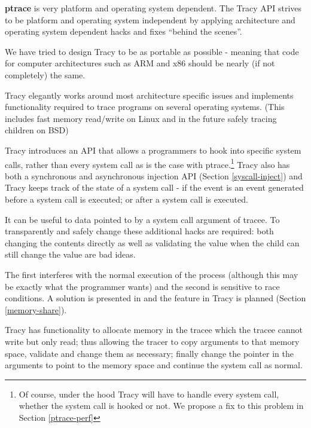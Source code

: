 \documentclass[a4paper, 10pt]{report}
\begin{document}
\textbf{ptrace} is very platform and operating system dependent.
The Tracy API strives to be platform and operating system independent by
applying architecture and operating system dependent hacks and fixes
``behind the scenes''.

We have tried to design Tracy to be as portable as possible - meaning that code
for computer architectures such as ARM and x86 should be nearly
(if not completely) the same.


Tracy elegantly works around most architecture specific issues and implements
functionality required to trace programs on several operating systems.
(This includes fast memory read/write on Linux and in the future safely tracing
children on BSD)

Tracy introduces an API that allows a programmers to hook into specific system
calls, rather than every system call as is the case with ptrace.\footnote{Of
course, under the hood Tracy will have to handle every system call, whether
the system call is hooked or not. We propose a fix to this problem in
Section \ref{ptrace-perf}} Tracy also has both a synchronous and asynchronous
injection API (Section \ref{syscall-inject}) and Tracy keeps
track of the state of a system call - if the event is an event generated before
a system call is executed; or after a system call is executed.

It can be useful to data pointed to by a system call argument of tracee.
To transparently and safely change these additional hacks are required:
both changing the contents directly as well as validating the value when the child
can still change the value are bad ideas.

The first interferes with the normal execution of the process
(although this may be exactly what the programmer wants) and the second is
sensitive to race conditions. A solution is presented in
\cite{Noordende_asecure} and the feature in Tracy is planned (Section
\ref{memory-share}).

Tracy has functionality to allocate memory in the tracee which
the tracee cannot write but only read; thus allowing the tracer
to copy arguments to that memory space, validate and change them as
necessary; finally change the pointer in the arguments to point to the memory
space and continue the system call as normal.
\end{document}
